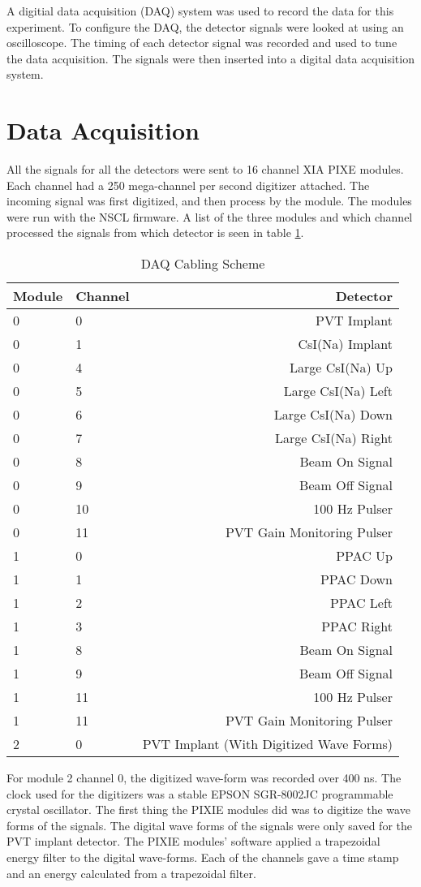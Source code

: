 \documentclass[../MaxHughesThesis.tex]{subfiles}
\begin{document}
A digitial data acquisition (DAQ) system was used to record the data for this experiment.
To configure the DAQ, the detector signals were looked at using an oscilloscope.
The timing of each detector signal was recorded and used to tune the data acquisition. 
The signals were then inserted into a digital data acquisition system.

\section{Data Acquisition}

All the signals for all the detectors were sent to 16 channel XIA PIXE modules. 
Each channel had a 250 mega-channel per second digitizer attached.
The incoming signal was first digitized, and then process by the module. 
The modules were run with the NSCL firmware.
A list of the three modules and which channel processed the signals from which detector is seen in table \ref{tab:cablingscheme}.
%
\begin{table}[!hbt]
	\centering
	\caption{DAQ Cabling Scheme}
		\begin{tabular}{llr}
		Module & Channel & Detector \\ \hline
		0 & 0 & PVT Implant \\
		0 & 1 & CsI(Na) Implant \\
		0 & 4 & Large CsI(Na) Up \\
		0 & 5 & Large CsI(Na) Left \\
		0 & 6 & Large CsI(Na) Down \\
		0 & 7 & Large CsI(Na) Right \\
		0 & 8 & Beam On Signal \\
		0 & 9 & Beam Off Signal \\
		0 & 10 & 100 Hz Pulser \\
		0 & 11 & PVT Gain Monitoring Pulser \\
		1 & 0 & PPAC Up \\ 
		1 & 1 & PPAC Down \\ 
		1 & 2 & PPAC Left \\ 
		1 & 3 & PPAC Right \\ 
		1 & 8 & Beam On Signal\\
		1 & 9 & Beam Off Signal\\
		1 & 11 & 100 Hz Pulser \\
		1 & 11 & PVT Gain Monitoring Pulser \\
		2 & 0 & PVT Implant (With Digitized Wave Forms)
		\end{tabular}	
		\label{tab:cablingscheme}
\end{table}
%
For module 2 channel 0, the digitized wave-form was recorded over 400 ns.
The clock used for the digitizers was a stable EPSON SGR-8002JC programmable crystal oscillator.
The first thing the PIXIE modules did was to digitize the wave forms of the signals.
The digital wave forms of the signals were only saved for the PVT implant detector.
The PIXIE modules' software applied a trapezoidal energy filter to the digital wave-forms.
Each of the channels gave a time stamp and an energy calculated from a trapezoidal filter.
\end{document}

